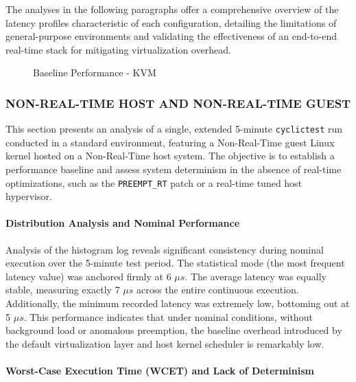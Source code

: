 The analyses in the following paragraphs offer a comprehensive overview
of the latency profiles characteristic of each configuration, detailing
the limitations of general-purpose environments and validating the
effectiveness of an end-to-end real-time stack for mitigating
virtualization overhead.

\begin{figure}
\centering

\caption{Baseline Performance - KVM}
\end{figure}

\subsubsection{NON-REAL-TIME HOST AND NON-REAL-TIME
GUEST}\label{non-real-time-host-and-non-real-time-guest}

This section presents an analysis of a single, extended 5-minute
\texttt{cyclictest} run conducted in a standard environment, featuring a
Non-Real-Time guest Linux kernel hosted on a Non-Real-Time host system.
The objective is to establish a performance baseline and assess system
determinism in the absence of real-time optimizations, such as the
\texttt{PREEMPT\_RT} patch or a real-time tuned host hypervisor.

\paragraph{Distribution Analysis and Nominal
Performance}\label{distribution-analysis-and-nominal-performance}

Analysis of the histogram log reveals significant consistency during
nominal execution over the 5-minute test period. The statistical mode
(the most frequent latency value) was anchored firmly at 6 $\mu s$. The
average latency was equally stable, measuring exactly 7 $\mu s$ across the
entire continuous execution. Additionally, the minimum recorded latency
was extremely low, bottoming out at 5 $\mu s$. This performance indicates
that under nominal conditions, without background load or anomalous
preemption, the baseline overhead introduced by the default
virtualization layer and host kernel scheduler is remarkably low.

\paragraph{Worst-Case Execution Time (WCET) and Lack of
Determinism}\label{worst-case-execution-time-wcet-and-lack-of-determinism}


